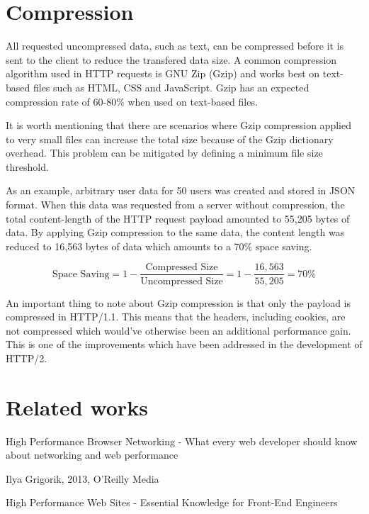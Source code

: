 \documentclass{cslthse-msc}
\begin{document}
\section{Compression}
\label{compression}

All requested uncompressed data, such as text, can be compressed before it is sent to the client to reduce the transfered data size. A common compression algorithm used in HTTP requests is GNU Zip (Gzip) and works best on text-based files such as HTML, CSS and JavaScript. Gzip has an expected compression rate of 60-80\% when used on text-based files\cite[page 237]{HPBN}.

It is worth mentioning that there are scenarios where Gzip compression applied to very small files can increase the total size because of the Gzip dictionary overhead. This problem can be mitigated by defining a minimum file size threshold\cite{google_gzip}.

As an example, arbitrary user data for 50 users was created and stored in JSON format. When this data was requested from a server without compression, the total content-length of the HTTP request payload amounted to 55,205 bytes of data. By applying Gzip compression to the same data, the content length was reduced to 16,563 bytes of data which amounts to a 70\% space saving. 

\begin{equation}
\mbox{Space Saving} = 1 - \frac{\mbox{Compressed Size}}{\mbox{Uncompressed Size}} = 1 - \frac{16,563}{55,205} = 70\%
\end{equation}

An important thing to note about Gzip compression is that only the payload is compressed in HTTP/1.1\cite{header_compression}. This means that the headers, including cookies, are not compressed which would've otherwise been an additional performance gain. This is one of the improvements which have been addressed in the development of HTTP/2\cite[page 222]{HPBN}.

\section{Related works}
High Performance Browser Networking - What every web developer should know about networking and web performance

Ilya Grigorik, 2013, O'Reilly Media

\vspace{5mm}
\noindent High Performance Web Sites - Essential Knowledge for Front-End Engineers
\end{document}
